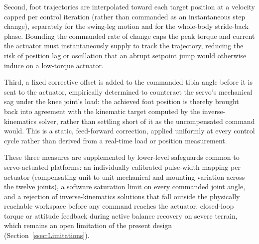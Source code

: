 Second, foot trajectories are interpolated toward each target position at a velocity capped per control iteration (rather than commanded as an instantaneous step change), separately for the swing-leg motion and for the whole-body stride-back phase. Bounding the commanded rate of change caps the peak torque and current the actuator must instantaneously supply to track the trajectory, reducing the risk of position lag or oscillation that an abrupt setpoint jump would otherwise induce on a low-torque actuator.

Third, a fixed corrective offset is added to the commanded tibia angle before it is sent to the actuator, empirically determined to counteract the servo's mechanical sag under the knee joint's load: the achieved foot position is thereby brought back into agreement with the kinematic target computed by the inverse-kinematics solver, rather than settling short of it as the uncompensated command would. This is a static, feed-forward correction, applied uniformly at every control cycle rather than derived from a real-time load or position measurement.

These three measures are supplemented by lower-level safeguards common to servo-actuated platforms: an individually calibrated pulse-width mapping per actuator (compensating unit-to-unit mechanical and mounting variation across the twelve joints), a software saturation limit on every commanded joint angle, and a rejection of inverse-kinematics solutions that fall outside the physically reachable workspace before any command reaches the actuator.  closed-loop torque or attitude feedback during active balance recovery on severe terrain, which remains an open limitation of the present design (Section~\ref{ssec:Limitations}).

